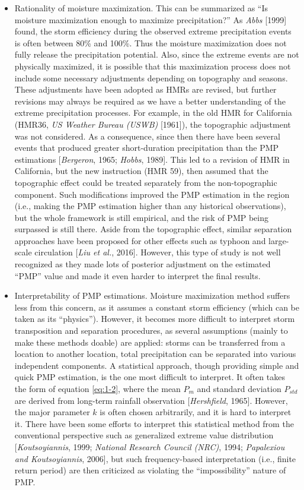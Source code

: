 \begin{itemize}
\item Rationality of moisture maximization. This can be summarized as ``Is moisture maximization enough to maximize precipitation?'' As \textit{Abbs} [1999] found, the storm efficiency during the observed extreme precipitation events is often between 80\% and 100\%. Thus the moisture maximization does not fully release the precipitation potential. Also, since the extreme events are not physically maximized, it is possible that this maximization process does not include some necessary adjustments depending on topography and seasons. These adjustments have been adopted as HMRs are revised, but further revisions may always be required as we have a better understanding of the extreme precipitation processes. For example, in the old HMR for California (HMR36, \textit{US Weather Bureau (USWB)} [1961]), the topographic adjustment was not considered. As a consequence, since then there have been several events that produced greater short-duration precipitation than the PMP estimations [\textit{Bergeron}, 1965; \textit{Hobbs}, 1989]. This led to a revision of HMR in California, but the new instruction (HMR 59), then assumed that the topographic effect could be treated separately from the non-topographic component. Such modifications improved the PMP estimation in the region (i.e., making the PMP estimation higher than any historical observations), but the whole framework is still empirical, and the risk of PMP being surpassed is still there. Aside from the topographic effect, similar separation approaches have been proposed for other effects such as typhoon and large-scale circulation [\textit{Liu et al.}, 2016]. However, this type of study is not well recognized as they made lots of posterior adjustment on the estimated ``PMP'' value and made it even harder to interpret the final results.

\item Interpretability of PMP estimations. Moisture maximization method suffers less from this concern, as it assumes a constant storm efficiency (which can be taken as its ``physics''). However, it becomes more difficult to interpret storm transposition and separation procedures, as several assumptions (mainly to make these methods doable) are applied: storms can be transferred from a location to another location, total precipitation can be separated into various independent components. A statistical approach, though providing simple and quick PMP estimation, is the one most difficult to interpret. It often takes the form of equation \ref{eq:1-2}, where the mean $P_{m}$ and standard deviation $P_{std}$ are derived from long-term rainfall observation [\textit{Hershfield}, 1965]. However, the major parameter $k$ is often chosen arbitrarily, and it is hard to interpret it. There have been some efforts to interpret this statistical method from the conventional perspective such as generalized extreme value distribution [\textit{Koutsoyiannis}, 1999; \textit{National Research Council (NRC)}, 1994; \textit{Papalexiou and Koutsoyiannis}, 2006], but such frequency-based interpretation (i.e., finite return period) are then criticized as violating the ``impossibility'' nature of PMP.


\end{itemize}
